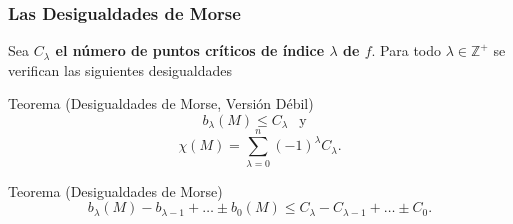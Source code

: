 \documentclass[11pt]{beamer}
\begin{document}
\begin{frame}
\frametitle{Las Desigualdades de Morse}
	Sea \textbf{$C_{\lambda}$ el número de puntos críticos de índice $\lambda$ de $f$}. Para todo $\lambda\in \mathbb{Z}^+$ se verifican las siguientes desigualdades
	\begin{block}{Teorema (Desigualdades de Morse, Versión Débil)} 
    	\begin{equation*}
        	b_{\lambda}(M) \le C_{\lambda} ~~\text{ y }~~ 
    	\end{equation*}
    	\begin{equation*}
        	\chi(M) = \sum_{\lambda=0}^{n} (-1)^{\lambda} C_{\lambda}.
    	\end{equation*}
	\end{block}
	
	\begin{alertblock}{Teorema (Desigualdades de Morse)}
		\vspace{1em}
    	\begin{equation*}
    	    b_{\lambda}(M)-b_{\lambda-1}+\dots\pm b_0(M) \le C_{\lambda}-C_{\lambda-1}+\dots\pm C_0.
    	\end{equation*}
		\vspace{0.2pt}
	\end{alertblock}

\end{frame}
\end{document}
